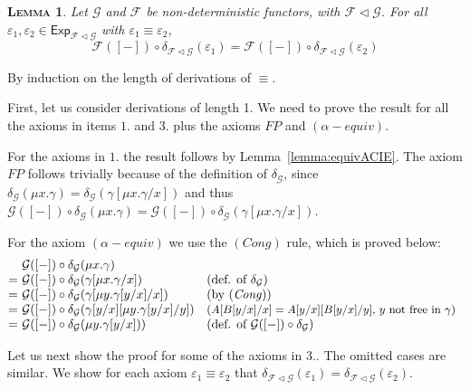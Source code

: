 \documentclass{LMCS}
\newcommand\E\varepsilon
\newcommand\Exp{\mathsf{Exp}}
\newcommand\G{\mathcal{G}}
\newcommand\F{\mathcal{F}}
\def\hyph{-\penalty0\hskip0pt\relax}
\theoremstyle{definition}
\theoremstyle{plain}
\newtheorem{mylemma}[mydefinition]{\textsc{Lemma}}
\theoremstyle{plain}
\theoremstyle{plain}
\theoremstyle{plain}
\theoremstyle{definition}
\theoremstyle{definition}
\newenvironment{lemma}{
\begin{mylemma}}
    {\end{mylemma}}
\begin{document}
\begin{lemma}\label{lemma:h_welldef}
Let $\G$ and $\F$ be non\hyph deterministic functors, with $\F\lhd \G$. For all $\E_1,\E_2\in \Exp_{\F\lhd \G}$ with $\E_1\equiv\E_2$,
$$\F([-])\circ
\delta_{\F\lhd \G}(\E_1) = \F([-])\circ
\delta_{\F\lhd \G}(\E_2)$$
\end{lemma}

\proof
By induction on the length
of
derivations of $\equiv$.

First, let us consider derivations of length 1. We need to prove the
result for all the axioms in items $1.$ and $3.$ plus the axioms
$\mathit{FP}$ and $(\alpha-\mathit{equiv})$.

For the axioms in $1.$ the result follows by
Lemma~\ref{lemma:equivACIE}. The axiom
$\mathit{FP}$ follows trivially because of the definition
of $\delta_{\G}$, since $\delta_{\G}(\mu x . \gamma) =
\delta_{\G}(\gamma[\mu x.\gamma/x])$ and thus $\G([-]) \circ
\delta_\G(\mu x . \gamma)= \G([-])\circ \delta_\G(\gamma[\mu x.\gamma/x])$. 

\medskip

For the axiom $(\alpha-\mathit{equiv})$ we use the
$(\mathit{Cong})$ rule, which is proved below:
$$
\begin{array}{@{}l@{\ }ll}
&\G([-])\circ \delta_\G(\mu x.\gamma) \\
=& \G([-])\circ \delta_\G(\gamma[\mu
x.\gamma/x]) & \text{(def. of $\delta_\G$)}\\
=&  \G([-])\circ \delta_\G(\gamma[\mu
y.\gamma[y/x]/x])&\text{(by $(\mathit{Cong})$)}\\
=& \G([-])\circ \delta_\G(\gamma[y/x][\mu
y.\gamma[y/x]/y])& \text{\small($A[B[y/x]/x] = A[y/x][B[y/x]/y]$, $y$ not
free in $\gamma$)}\\
=& \G([-])\circ \delta_\G(\mu y. \gamma[y/x])) & \text{(def. of $\G([-])\circ \delta_\G$)}
\end{array}$$
\medskip

Let us next show the proof for some of the axioms in $3.$. The omitted
cases are similar. We show for each axiom $\E_1\equiv \E_2$ that
$\delta_{\F\lhd \G} (\E_1)=\delta_{\F\lhd \G} (\E_2)$.
\medskip
\end{document}
